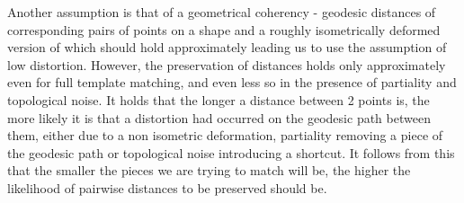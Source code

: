 \documentclass[10pt,twocolumn,letterpaper]{article}
\begin{document}
Another assumption is that of a geometrical coherency  - geodesic distances of corresponding pairs of points on a shape and a roughly isometrically deformed version of which should hold approximately leading us to use the assumption of low distortion.
However, the preservation of distances holds only approximately even for full template matching, and even less so in the presence of partiality and topological noise.
It holds that the longer a distance between 2 points is, the more likely it is that a distortion had occurred on the geodesic path between them, either due to a non isometric deformation, partiality removing a piece of the geodesic path or topological noise introducing a shortcut.
It follows from this that the smaller the pieces we are trying to match will be, the higher the likelihood of pairwise distances to be preserved should be.
\end{document}
